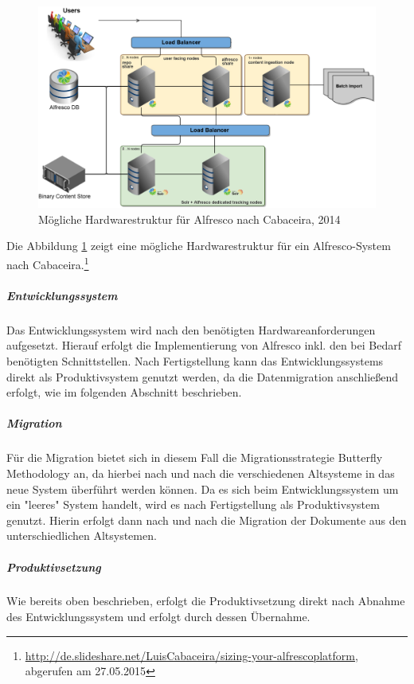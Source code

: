 \begin{figure}[h!]
	\centering
	\includegraphics[width=\textwidth]
	{kapitel/gruppe4_1/bilder/deployment_diagramm_alfresco}
	\caption{Mögliche Hardwarestruktur für Alfresco nach Cabaceira, 2014}
	\label{fig_deployment_alfresco}
\end{figure}

Die Abbildung \ref{fig_deployment_alfresco} zeigt eine mögliche Hardwarestruktur für ein Alfresco-System nach Cabaceira.\footnote{\url{http://de.slideshare.net/LuisCabaceira/sizing-your-alfrescoplatform}, abgerufen am 27.05.2015}

\subparagraph{Entwicklungssystem}
Das Entwicklungssystem wird nach den benötigten Hardwareanforderungen aufgesetzt. Hierauf erfolgt die Implementierung von Alfresco inkl. den bei Bedarf benötigten Schnittstellen. Nach Fertigstellung kann das Entwicklungssystems direkt als Produktivsystem genutzt werden, da die Datenmigration anschließend erfolgt, wie im folgenden Abschnitt beschrieben.

\subparagraph{Migration}
Für die Migration bietet sich in diesem Fall die Migrationsstrategie Butterfly Methodology an, da hierbei nach und nach die verschiedenen Altsysteme in das neue System überführt werden können. Da es sich beim Entwicklungssystem um ein "leeres" System handelt, wird es nach Fertigstellung als Produktivsystem genutzt. Hierin erfolgt dann nach und nach die Migration der Dokumente aus den unterschiedlichen Altsystemen.

\subparagraph{Produktivsetzung}
Wie bereits oben beschrieben, erfolgt die Produktivsetzung direkt nach Abnahme des Entwicklungssystem und erfolgt durch dessen Übernahme.

